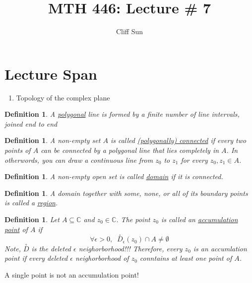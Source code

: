 \documentclass{article}
\title{MTH 446: Lecture \# 7}
\author{Cliff Sun}
\newtheorem{definition}[theorem]{Definition}
\newtheorem{one minute paper}[theorem]{One Minute Paper}
\begin{document}
\maketitle

\section*{Lecture Span}
\begin{enumerate}
    \item Topology of the complex plane
\end{enumerate}

\begin{definition}
    A \underline{polygonal} line is formed by a finite number of line intervals, joined end to end 
\end{definition}

\begin{definition}
    A non-empty set $A$ is called \underline{(polygonally) connected} if every two points of $A$ can be connected by a polygonal line that lies completely in $A$. 
    In otherwords, you can draw a continuous line from $z_0$ to $z_1$ for every $z_0,z_1 \in A$. 
\end{definition}

\begin{definition}
    A non-empty open set is called \underline{domain} if it is connected. 
\end{definition}

\begin{definition}
    A domain together with some, none, or all of its boundary points is called a \underline{region}. 
\end{definition}

\begin{definition}
    Let $A \subseteq \mathbb{C}$ and $z_0 \in \mathbb{C}$. The point $z_0$ is called an \underline{accumulation point} of $A$ if 
    \begin{equation}
        \forall \epsilon > 0, \;\; \overset{\circ}{D}_{\epsilon}(z_0) \cap A \neq \emptyset
    \end{equation}
    Note, $\overset{\circ}{D}$ is the \textit{deleted $\epsilon$ neighorborhood!!!} Therefore, every $z_0$ is an accumlation point if every deleted $\epsilon$ neighorborhood of $z_0$ conntains at least one point of $A$. 
\end{definition}

A single point is not an accumulation point!
\end{document}
